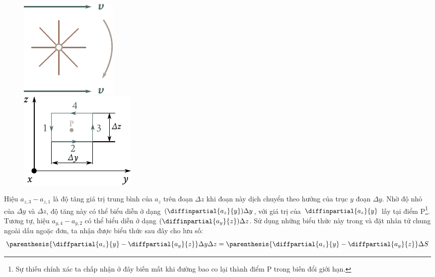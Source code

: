 \begin{figure}[!htb]
	\begin{minipage}[t]{0.5\linewidth}
		\begin{center}
			\includegraphics[scale=1]{figures/ch_01/fig_1_30.pdf}
			\caption[]{}
			\label{fig:1_30}
		\end{center}
	\end{minipage}
	\hspace{-0.1cm}
	\begin{minipage}[t]{0.5\linewidth}
		\begin{center}
			\includegraphics[scale=1]{figures/ch_01/fig_1_31.pdf}
			\caption[]{}
			\label{fig:1_31}
		\end{center}
	\end{minipage}
\vspace{-0.4cm}
\end{figure}

Hiệu $a_{z,3}-a_{z,1}$ là độ tăng giá trị trung bình của $a_z$ trên đoạn $\Delta{z}$ khi đoạn này dịch chuyển theo hướng của trục $y$ đoạn $\Delta{y}$. Nhờ độ nhỏ của $\Delta{y}$ và $\Delta{z}$, độ tăng này có thể biểu diễn ở dạng $(\diffinpartial{a_z}{y})\Delta{y}$, với giá trị của $\diffinpartial{a_z}{y}$ lấy tại điểm P\footnote{Sự thiếu chính xác ta chấp nhận ở đây biến mất khi đường bao co lại thành điểm P trong biến đổi giới hạn.}. Tương tự, hiệu $a_{y,4}-a_{y,2}$ có thể biểu diễn ở dạng $(\diffinpartial{a_y}{z})\Delta{z}$.
Sử dụng những biểu thức này trong  và đặt nhân tử chung ngoài dấu ngoặc đơn, ta nhận được biểu thức sau đây cho lưu số:
\begin{equation*}
	\parenthesis{\diffpartial{a_z}{y} - \diffpartial{a_y}{z}} \Delta{y}\Delta{z} = \parenthesis{\diffpartial{a_z}{y} - \diffpartial{a_y}{z}} \Delta{S}
\end{equation*}

